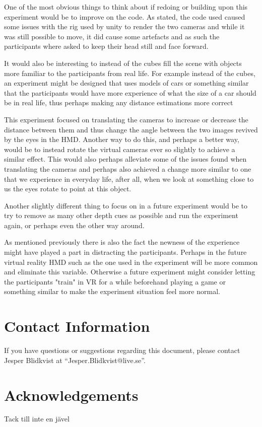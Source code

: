 \documentclass[tog]{acmsiggraph}
\begin{document}
One of the most obvious things to think about if redoing or building upon this experiment would be to improve on the code. As stated, the code used caused some issues with the rig used by unity to render the two cameras and while it was still possible to move, it did cause some artefacts and as such the participants where asked to keep their head still and face forward.

It would also be interesting to instead of the cubes fill the scene with objects more familiar to the participants from real life. For example instead of the cubes, an experiment might be designed that uses models of cars or something similar that the participants would have more experience of what the size of a car should be in real life, thus perhaps making any distance estimations more correct 

This experiment focused on translating the cameras to increase or decrease the distance between them and thus change the angle between the two images revived by the eyes in the HMD. Another way to do this, and perhaps a better way, would be to instead rotate the virtual cameras ever so slightly to achieve a similar effect. This would also perhaps alleviate some of the issues found when translating the cameras and perhaps also achieved a change more similar to one that we experience in everyday life, after all, when we look at something close to us the eyes rotate to point at this object.

Another slightly different thing to focus on in a future experiment would be to try to remove as many other depth cues as possible and run the experiment again, or perhaps even the other way around. 

As mentioned previously there is also the fact the newness of the experience might have played a part in distracting the participants. Perhaps in the future virtual reality HMD such as the one used in the experiment will be more common and eliminate this variable. Otherwise a future experiment might consider letting the participants "train" in VR for a while beforehand playing a game or something similar to make the experiment situation feel more normal.

\section{Contact Information}

If you have questions or suggestions regarding this document, please
contact Jesper Blidkvist at ``Jesper.Blidkvist@live.se''.

\section*{Acknowledgements}

Tack till inte en jävel


\nocite{*}

\end{document}
